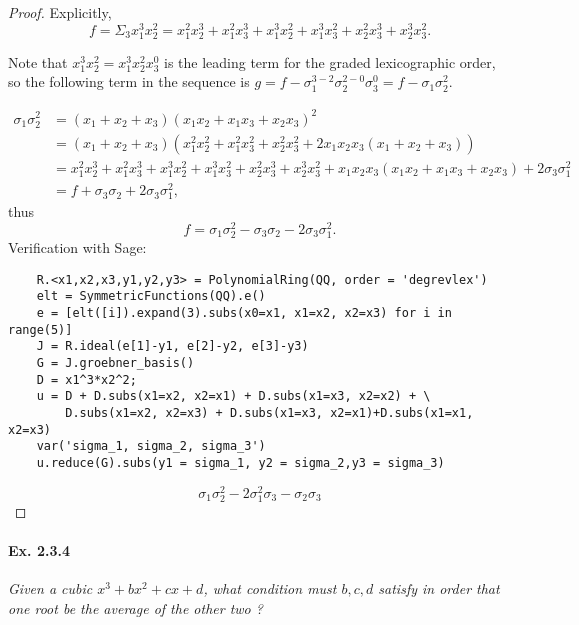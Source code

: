 \documentclass[11pt,a4paper]{article}
\begin{document}
\begin{proof}
Explicitly, 
$$f = \Sigma_3 x_1^3 x_2^2 = x_1^2x_2^3+x_1^2 x_3^3 + x_1^3 x_2^2+x_1^3 x_3^2 +x_2^2x_3^3+x_2^3 x_3^2.$$

Note that $x_1^3 x_2^2 = x_1^3 x_2^2 x_3^0$ is the leading term for the graded lexicographic order, so the following term in the sequence is $g = f - \sigma_1^{3-2} \sigma_2^{2-0} \sigma_3^0 = f - \sigma_1 \sigma_2^2$.

\begin{align*}
\sigma_1 \sigma_2^2 &= (x_1+x_2+x_3) (x_1 x_2+x_1x_3+x_2x_3)^2\\
&= (x_1+x_2+x_3) (x_1^2 x_2^2+x_1^2x_3^2+x_2^2x_3^2+2x_1x_2x_3(x_1+x_2+x_3))\\
&= x_1^2x_2^3+x_1^2 x_3^3 + x_1^3 x_2^2+x_1^3 x_3^2 +x_2^2x_3^3+x_2^3 x_3^2+x_1x_2x_3(x_1 x_2+x_1x_3+x_2x_3)+2\sigma_3 \sigma_1^2 \\
&=f+ \sigma_3 \sigma_2+2\sigma_3 \sigma_1^2,
\end{align*}
thus
$$f =\sigma_1 \sigma_2^2- \sigma_3 \sigma_2-2\sigma_3 \sigma_1^2.$$
Verification with Sage:
\begin{verbatim}
    R.<x1,x2,x3,y1,y2,y3> = PolynomialRing(QQ, order = 'degrevlex')
    elt = SymmetricFunctions(QQ).e()
    e = [elt([i]).expand(3).subs(x0=x1, x1=x2, x2=x3) for i in range(5)]
    J = R.ideal(e[1]-y1, e[2]-y2, e[3]-y3)
    G = J.groebner_basis()
    D = x1^3*x2^2;
    u = D + D.subs(x1=x2, x2=x1) + D.subs(x1=x3, x2=x2) + \
    	D.subs(x1=x2, x2=x3) + D.subs(x1=x3, x2=x1)+D.subs(x1=x1, x2=x3)
    var('sigma_1, sigma_2, sigma_3')
    u.reduce(G).subs(y1 = sigma_1, y2 = sigma_2,y3 = sigma_3)
\end{verbatim}
$$\sigma_1 \sigma_2^2-2\sigma_1^2\sigma_3 - \sigma_2 \sigma_3$$
\end{proof}

\paragraph{Ex. 2.3.4}

{\it Given a cubic $x^3+bx^2+cx+d$, what condition must $b,c,d$ satisfy in order that one root be the average of the other two ?
}
\end{document}
